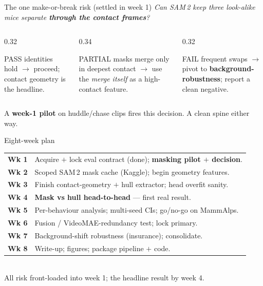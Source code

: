 \documentclass[aspectratio=169,11pt]{beamer}
\begin{document}
\begin{frame}{The one make-or-break risk (settled in week 1)}
\centering\small
\emph{Can SAM\,2 keep three look-alike mice separate \textbf{through the contact frames}?}
\vspace{0.6em}
\begin{columns}[T]
\begin{column}{0.32\textwidth}
\begin{block}{\small PASS}
\footnotesize identities hold $\rightarrow$ proceed; contact geometry is the headline.
\end{block}
\end{column}
\begin{column}{0.34\textwidth}
\begin{block}{\small PARTIAL}
\footnotesize masks merge only in deepest contact $\rightarrow$ use the \emph{merge itself} as a
        high-contact feature.
\end{block}
\end{column}
\begin{column}{0.32\textwidth}
\begin{block}{\small FAIL}
\footnotesize frequent swaps $\rightarrow$ pivot to \textbf{background-robustness}; report a clean
        negative.
\end{block}
\end{column}
\end{columns}
\vspace{0.6em}
  A \textbf{week-1 pilot} on huddle/chase clips fires this decision. A clean spine either way.
\end{frame}
\begin{frame}{Eight-week plan}
\footnotesize
\begin{tabular}{@{}rl@{}}
\textbf{Wk 1} & Acquire $+$ lock eval contract \;\textcolor{forest}{(done)}; \textbf{masking pilot $+$ decision}.\\
\textbf{Wk 2} & Scoped SAM\,2 mask cache (Kaggle); begin geometry features.\\
\textbf{Wk 3} & Finish contact-geometry $+$ hull extractor; head overfit sanity.\\
\textbf{Wk 4} & \textbf{Mask vs hull head-to-head} — first real result.\\
\textbf{Wk 5} & Per-behaviour analysis; multi-seed CIs; go/no-go on MammAlps.\\
\textbf{Wk 6} & Fusion / VideoMAE-redundancy test; lock primary.\\
\textbf{Wk 7} & Background-shift robustness (insurance); consolidate.\\
\textbf{Wk 8} & Write-up; figures; package pipeline $+$ code.\\
\end{tabular}
\vspace{0.5em}\\
  All risk front-loaded into week 1; the headline result by week 4.
\end{frame}
\end{document}
